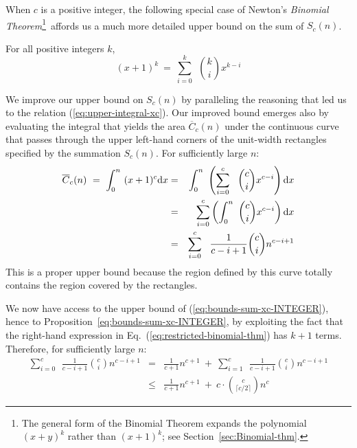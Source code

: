 When $c$ is a positive integer, the following special case of Newton's {\it Binomial Theorem}\footnote{The general form of the Binomial Theorem expands the polynomial $(x+y)^k$ rather than $(x+1)^k$; see Section~\ref{sec:Binomial-thm}.}~affords us a much more detailed upper bound on the sum of $S_c(n)$.

\begin{theorem}
\label{thm:restricted-binomial-thm}
For all positive integers $k$,
\begin{equation}
\label{eq:restricted-binomial-thm}
(x+1)^k \ = \ \sum_{i=0}^k \ \ {k \choose i} x^{k-i}
\end{equation}
\end{theorem}

We improve our upper bound on $S_c(n)$ by paralleling the reasoning that led us to the relation (\ref{eq:upper-integral-xc}).  Our improved bound emerges also by evaluating the integral that
yields the area $\overline{C}_c(n)$ under the continuous curve that passes through the upper left-hand corners of the unit-width rectangles specified by the summation $S_c(n)$.  For sufficiently large $n$:
\begin{eqnarray}
\nonumber
\overline{C}_c(n) \ = \
\int_0^n \ (x+1)^c {\rm d}x & = &
\int_0^n \ \left(\sum_{i=0}^c \ \ {c \choose i} x^{c-i} \right) {\rm d}x \\
\nonumber
& = &
\sum_{i=0}^c \left( \int_0^n \  {c \choose i} x^{c-i} \right) {\rm d}x \\
\label{eq:upper-integral-xk}
  & = &
\sum_{i=0}^c \ \ \frac{1}{c-i+1} {c \choose i} n^{c-i+1}
\end{eqnarray}
This is a proper upper bound because the region defined by this curve totally contains the region covered by the rectangles.

\smallskip

We now have access to the upper bound of (\ref{eq:bounds-sum-xc-INTEGER}), hence to Proposition~\ref{eq:bounds-sum-xc-INTEGER}, by exploiting the fact that the right-hand expression in Eq.~(\ref{eq:restricted-binomial-thm}) has $k+1$ terms.  Therefore, for sufficiently large $n$:
\begin{eqnarray}
\nonumber
\sum_{i=0}^c \ \ \frac{1}{c-i+1} {c \choose i} n^{c-i+1}
  & = & 
\frac{1}{c+1} n^{c+1} \ + \ \sum_{i=1}^c \ \ \frac{1}{c-i+1} {c \choose i} n^{c-i+1} \\
\label{eq:bounds-sum-xk}
  & \leq & 
\frac{1}{c+1} n^{c+1} \ + \  c \cdot {c \choose \lceil c/2 \rceil} n^c
\end{eqnarray}

